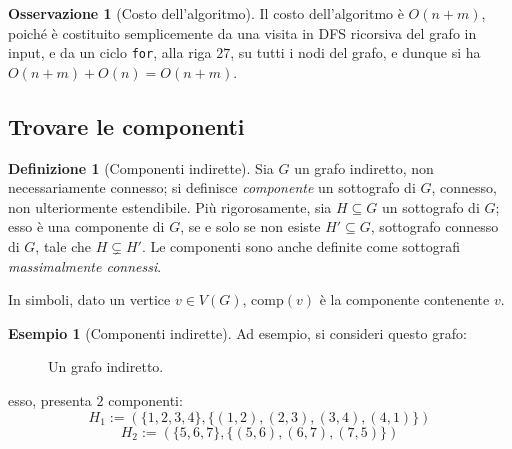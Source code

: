 \documentclass[14pt]{extreport}
\theoremstyle{definition}
\newtheorem{definition}{Definizione}[subsection]
\theoremstyle{definition}
\newtheorem{remark}{Osservazione}[subsection]
\newtheorem{example}{Esempio}[subsection]
\begin{document}
\begin{remark}[Costo dell'algoritmo]
    Il costo dell'algoritmo è $O(n + m)$, poiché è costituito semplicemente da una visita in DFS ricorsiva del grafo in input, e da un ciclo \texttt{for}, alla riga $27$, su tutti i nodi del grafo, e dunque si ha $O(n + m) + O(n) = O(n + m)$.
\end{remark}

\subsection{Trovare le componenti}

\begin{definition}[Componenti indirette]
    Sia $G$ un grafo indiretto, non necessariamente connesso; si definisce \textit{componente} un sottografo di $G$, connesso, non ulteriormente estendibile. Più rigorosamente, sia $H \subseteq G$ un sottografo di $G$; esso è una componente di $G$, se e solo se non esiste $H' \subseteq G$, sottografo connesso di $G$, tale che $H \subsetneq H'$. Le componenti sono anche definite come sottografi \textit{massimalmente connessi}.

    In simboli, dato un vertice $v \in V(G)$, $\mathrm{comp}(v)$ è la componente contenente $v$.
\end{definition}

\begin{example}[Componenti indirette]
    Ad esempio, si consideri questo grafo:

    \begin{figure}[H]
        \centering
        \caption{Un grafo indiretto.}
    \end{figure}

    esso, presenta $2$ componenti: $$H_1 := (\{1, 2, 3, 4\}, \{(1, 2), (2, 3), (3, 4), (4, 1)\})$$ $$H_2 := (\{5, 6, 7\}, \{(5, 6), (6, 7), (7, 5)\})$$
\end{example}
\end{document}
